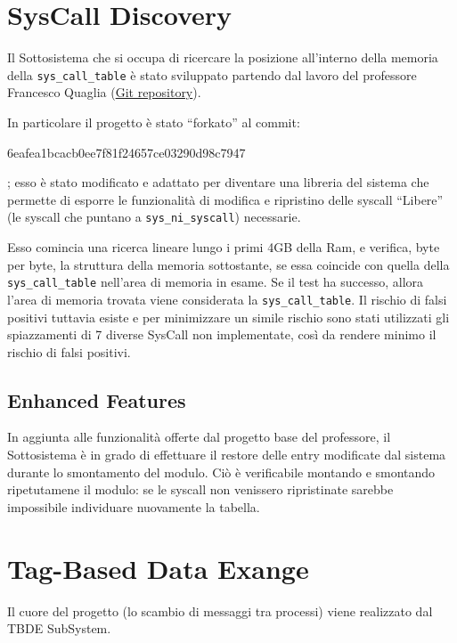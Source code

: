 \section{SysCall Discovery} \label{SysCallDiscovery}

Il Sottosistema che si occupa di ricercare la posizione all'interno della memoria della \verb|sys_call_table| è stato
sviluppato partendo dal lavoro del professore Francesco Quaglia
(\href{https://github.com/FrancescoQuaglia/Linux-sys_call_table-discoverer}{Git repository}).

In particolare il progetto è stato ``forkato'' al commit:
\begin{verb}6eafea1bcacb0ee7f81f24657ce03290d98c7947\end{verb}; esso è stato modificato e
adattato per diventare una libreria del sistema che permette di esporre le funzionalità di modifica e ripristino
delle syscall ``Libere'' (le syscall che puntano a \verb|sys_ni_syscall|) necessarie.

Esso comincia una ricerca lineare lungo i primi 4GB della Ram, e verifica, byte per byte, la struttura della memoria
sottostante, se essa coincide con quella della \verb|sys_call_table| nell'area di memoria in esame.
Se il test ha successo, allora l'area di memoria trovata viene considerata la \verb|sys_call_table|.
Il rischio di falsi positivi tuttavia esiste e per minimizzare un simile rischio sono stati utilizzati gli
spiazzamenti di 7 diverse SysCall non implementate, così da rendere minimo il rischio di falsi positivi.

\subsection{Enhanced Features} \label{SysCallDiscovery_EnhancedFeatures}
In aggiunta alle funzionalità offerte dal progetto base del professore, il Sottosistema è in grado di effettuare il
restore delle entry modificate dal sistema durante lo smontamento del modulo.
Ciò è verificabile montando e smontando ripetutamene il modulo: se le syscall non venissero ripristinate sarebbe
impossibile individuare nuovamente la tabella.
\newpage


\section{Tag-Based Data Exange} \label{tbde}

Il cuore del progetto (lo scambio di messaggi tra processi) viene realizzato dal TBDE SubSystem.

